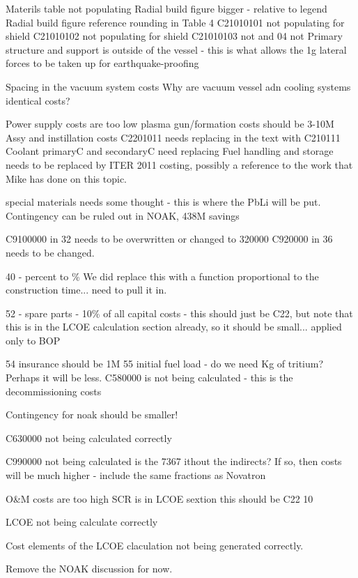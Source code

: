 Materils table not populating
Radial build figure bigger - relative to legend
Radial build figure reference
rounding in Table 4
C21010101 not populating for shield
C21010102 not populating for shield
C21010103 not and 04 not
Primary structure and support is outside of the vessel - this is what allows the 1g lateral forces to be taken up for earthquake-proofing

Spacing in the vacuum system costs
Why are vacuum vessel adn cooling systems identical costs?

Power supply costs are too low
plasma gun/formation costs should be 3-10M
Assy and instillation costs C2201011 needs replacing in the text with C210111
Coolant primaryC and secondaryC need replacing
Fuel handling and storage needs to be replaced by ITER 2011 costing, possibly a reference to the work that Mike has done on this topic.

special materials needs some thought - this is where the PbLi will be put.
Contingency can be ruled out in NOAK, 438M savings

C9100000 in 32 needs to be overwritten or changed to 320000
C920000 in 36 needs to be changed.

40 - percent to \%
We did replace this with a function proportional to the construction time... need to pull it in.

52 - spare parts - 10\% of all capital costs - this should just be C22, but note that this is in the LCOE calculation section already, so it should be small... applied only to BOP

54 insurance should be 1M
55 initial fuel load - do we need Kg of tritium?  Perhaps it will be less.
C580000 is not being calculated - this is the decommissioning costs

Contingency for noak should be smaller!

C630000 not being calculated correctly

C990000 not being calculated
is the 7367 ithout the indirects?  If so, then costs will be much higher - include the same fractions as Novatron

O&M costs are too high
SCR is in LCOE sextion this should be C22 10%

LCOE not being calculate correctly  

Cost elements of the LCOE claculation not being generated correctly.

Remove the NOAK discussion for now.
